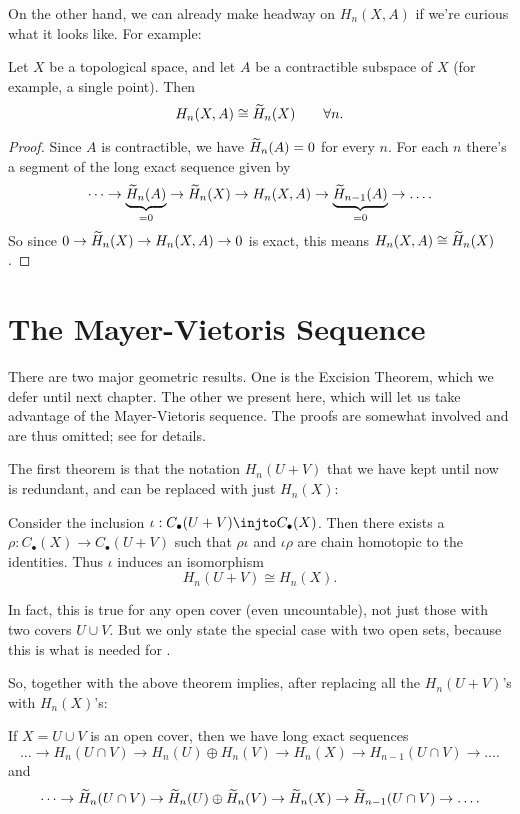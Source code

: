 On the other hand, we can already make headway on $H_n(X,A)$ if we're curious what it looks like.
For example:
\begin{lemma}
	\label{lem:rel_contractible}
	Let $X$ be a topological space, and let $A$ be a contractible subspace of $X$
	(for example, a single point).
	Then \[ H_n(X, A) \cong \widetilde H_n(X) \qquad \forall n. \]
\end{lemma}
\begin{proof}
	Since $A$ is contractible, we have $\widetilde H_n(A) = 0$ for every $n$.
	For each $n$ there's a segment of the long exact sequence given by
	\[ \dots \to \underbrace{\widetilde H_n(A)}_{=0} \to \widetilde H_n(X) \to H_n(X,A)
	\to \underbrace{\widetilde H_{n-1}(A)}_{=0} \to \dots. \]
	So since $0 \to \widetilde H_n(X) \to H_n(X,A) \to 0$ is exact,
	this means $H_n(X,A) \cong \widetilde H_n(X)$.
\end{proof}


\section{The Mayer-Vietoris Sequence}

There are two major geometric results.
One is the Excision Theorem, which we defer until next chapter.
The other we present here, which will let us take advantage of the
Mayer-Vietoris sequence.
The proofs are somewhat involved and are thus omitted;
see \cite{ref:hatcher} for details.

The first theorem is that the notation $H_n(U+V)$ that we have kept until now
is redundant, and can be replaced with just $H_n(X)$:
\begin{theorem}
	Consider the inclusion $\iota : C_\bullet(U+V) \injto C_\bullet(X)$.
	Then there exists a $\rho : C_\bullet(X) \to C_\bullet(U+V)$ such that
	$\rho\iota$ and $\iota\rho$ are chain homotopic to the identities.
	Thus $\iota$ induces an isomorphism
	\[ H_n(U+V) \cong H_n(X). \]
\end{theorem}
\begin{remark}
	In fact, this is true for any open cover (even uncountable),
	not just those with two covers $U \cup V$.
	But we only state the special case with two open sets,
	because this is what is needed for .
\end{remark}
So,  together with the above theorem implies,
after replacing all the $H_n(U+V)$'s with $H_n(X)$'s:
\begin{theorem}
	If $X = U \cup V$ is an open cover, then we have long exact sequences
	\[ \dots \to H_n(U \cap V) \to H_n(U) \oplus H_n(V)
		\to H_n(X) \to H_{n-1}(U \cap V) \to \dots. \]
	and
	\[ \dots \to \widetilde H_n(U \cap V) \to \widetilde H_n(U) \oplus \widetilde H_n(V) \to
		\widetilde H_n(X) \to \widetilde H_{n-1}(U \cap V) \to \dots. \]
\end{theorem}

